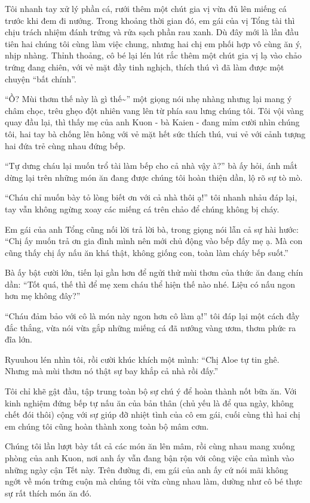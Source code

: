 \documentclass[../main.tex]{subfiles}
\begin{document}
Tôi nhanh tay xử lý phần cá, rưới thêm một chút gia vị vừa đủ lên miếng cá trước khi đem đi nướng. Trong khoảng thời gian đó, em gái của vị Tổng tài thì chịu trách nhiệm đánh trứng và rửa sạch phần rau xanh. Dù đây mới là lần đầu tiên hai chúng tôi cùng làm việc chung, nhưng hai chị em phối hợp vô cùng ăn ý, nhịp nhàng. Thỉnh thoảng, cô bé lại lén lút rắc thêm một chút gia vị lạ vào chảo trứng đang chiên, với vẻ mặt đầy tinh nghịch, thích thú vì đã làm được một chuyện ``bất chính''.

``Ồ? Mùi thơm thế này là gì thế\~{}'' một giọng nói nhẹ nhàng nhưng lại mang ý châm chọc, trêu ghẹo đột nhiên vang lên từ phía sau lưng chúng tôi. Tôi vội vàng quay đầu lại, thì thấy mẹ của anh Kuon - bà Kaien - đang mỉm cười nhìn chúng tôi, hai tay bà chống lên hông với vẻ mặt hết sức thích thú, vui vẻ với cảnh tượng hai đứa trẻ cùng nhau đứng bếp.

``Tự dưng cháu lại muốn trổ tài làm bếp cho cả nhà vậy à?'' bà ấy hỏi, ánh mắt dừng lại trên những món ăn đang được chúng tôi hoàn thiện dần, lộ rõ sự tò mò.

``Cháu chỉ muốn bày tỏ lòng biết ơn với cả nhà thôi ạ!'' tôi nhanh nhảu đáp lại, tay vẫn không ngừng xoay các miếng cá trên chảo để chúng không bị cháy.

Em gái của anh Tổng cũng nối lời trả lời bà, trong giọng nói lẫn cả sự hài hước: ``Chị ấy muốn trả ơn gia đình mình nên mới chủ động vào bếp đấy mẹ ạ. Mà con cũng thấy chị ấy nấu ăn khá thật, không giống con, toàn làm cháy bếp suốt.''

Bà ấy bật cười lớn, tiến lại gần hơn để ngửi thử mùi thơm của thức ăn đang chín dần: ``Tốt quá, thế thì để mẹ xem cháu thể hiện thế nào nhé. Liệu có nấu ngon hơn mẹ không đây?''

``Cháu đảm bảo với cô là món này ngon hơn cô làm ạ!'' tôi đáp lại một cách đầy đắc thắng, vừa nói vừa gắp những miếng cá đã nướng vàng ươm, thơm phức ra đĩa lớn.

Ryuuhou lén nhìn tôi, rồi cười khúc khích một mình: ``Chị Aloe tự tin ghê. Nhưng mà mùi thơm nó thật sự bay khắp cả nhà rồi đấy.''

Tôi chỉ khẽ gật đầu, tập trung toàn bộ sự chú ý để hoàn thành nốt bữa ăn. Với kinh nghiệm đứng bếp tự nấu ăn của bản thân (chủ yếu là để qua ngày, không chết đói thôi) cộng với sự giúp đỡ nhiệt tình của cô em gái, cuối cùng thì hai chị em chúng tôi cũng hoàn thành xong toàn bộ mâm cơm.

Chúng tôi lần lượt bày tất cả các món ăn lên mâm, rồi cùng nhau mang xuống phòng của anh Kuon, nơi anh ấy vẫn đang bận rộn với công việc của mình vào những ngày cận Tết này. Trên đường đi, em gái của anh ấy cứ nói mãi không ngớt về món trứng cuộn mà chúng tôi vừa cùng nhau làm, dường như cô bé thực sự rất thích món ăn đó.
\end{document}

